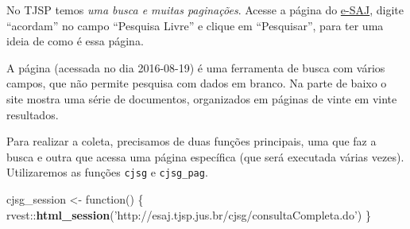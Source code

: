 \documentclass[]{book}
\newenvironment{Shaded}{\begin{snugshade}}{\end{snugshade}}
\newcommand{\KeywordTok}[1]{\textcolor[rgb]{0.13,0.29,0.53}{\textbf{{#1}}}}
\newcommand{\DataTypeTok}[1]{\textcolor[rgb]{0.13,0.29,0.53}{{#1}}}
\newcommand{\DecValTok}[1]{\textcolor[rgb]{0.00,0.00,0.81}{{#1}}}
\newcommand{\StringTok}[1]{\textcolor[rgb]{0.31,0.60,0.02}{{#1}}}
\newcommand{\OtherTok}[1]{\textcolor[rgb]{0.56,0.35,0.01}{{#1}}}
\newcommand{\NormalTok}[1]{{#1}}
\begin{document}
No TJSP temos \emph{uma busca e muitas paginações}. Acesse a página do
\href{http://esaj.tjsp.jus.br/cjsg/consultaCompleta.do}{e-SAJ}, digite
``acordam'' no campo ``Pesquisa Livre'' e clique em ``Pesquisar'', para
ter uma ideia de como é essa página.

A página (acessada no dia 2016-08-19) é uma ferramenta de busca com
vários campos, que não permite pesquisa com dados em branco. Na parte de
baixo o site mostra uma série de documentos, organizados em páginas de
vinte em vinte resultados.

Para realizar a coleta, precisamos de duas funções principais, uma que
faz a busca e outra que acessa uma página específica (que será executada
várias vezes). Utilizaremos as funções \texttt{cjsg} e
\texttt{cjsg\_pag}.

\begin{Shaded}
\begin{Highlighting}[]
\NormalTok{cjsg_session <-}\StringTok{ }\NormalTok{function() \{}
  \NormalTok{rvest::}\KeywordTok{html_session}\NormalTok{(}\StringTok{'http://esaj.tjsp.jus.br/cjsg/consultaCompleta.do'}\NormalTok{)}
\NormalTok{\}}
\end{Highlighting}
\end{Shaded}

\begin{Shaded}
\end{Shaded}
\end{document}
